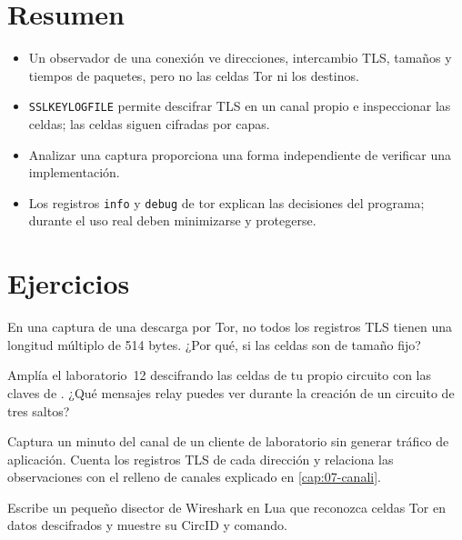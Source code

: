 \section*{Resumen}
\begin{itemize}
  \item Un observador de una conexión ve direcciones, intercambio TLS, tamaños y tiempos de paquetes, pero no las celdas Tor ni los destinos.
  \item \texttt{SSLKEYLOGFILE} permite descifrar TLS en un canal propio e inspeccionar las celdas; las celdas  siguen cifradas por capas.
  \item Analizar una captura proporciona una forma independiente de verificar una implementación.
  \item Los registros \texttt{info} y \texttt{debug} de tor explican las decisiones del programa; durante el uso real deben minimizarse y protegerse.
\end{itemize}

\section*{Ejercicios}

\begin{esercizio}[1]\label{es:20-dimensioni}
En una captura de una descarga por Tor, no todos los registros TLS tienen una longitud múltiplo de 514 bytes. ¿Por qué, si las celdas son de tamaño fijo?
\end{esercizio}

\begin{esercizio}[2]\label{es:20-relay}
Amplía el laboratorio~12 descifrando las celdas  de tu propio circuito con las claves de . ¿Qué mensajes relay puedes ver durante la creación de un circuito de tres saltos?
\end{esercizio}

\begin{esercizio}[2]\label{es:20-padding}
Captura un minuto del canal de un cliente de laboratorio sin generar tráfico de aplicación. Cuenta los registros TLS de cada dirección y relaciona las observaciones con el relleno de canales explicado en \cref{cap:07-canali}.
\end{esercizio}

\begin{esercizio}[3]\label{es:20-dissector}
Escribe un pequeño disector de Wireshark en Lua que reconozca celdas Tor en datos descifrados y muestre su CircID y comando.
\end{esercizio}

